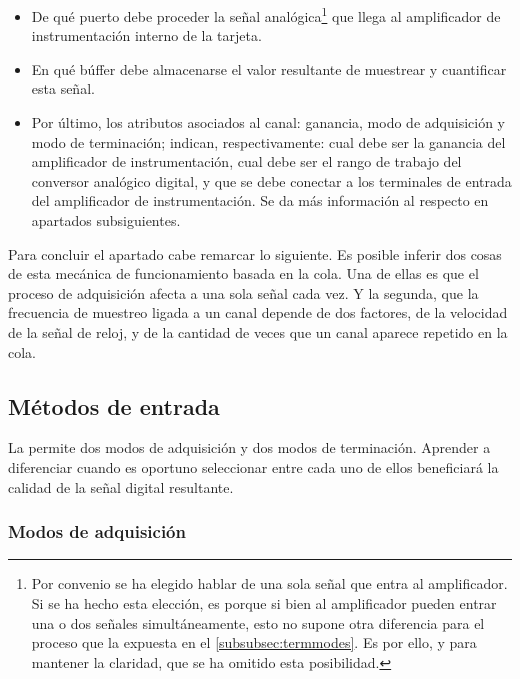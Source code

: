 \begin{itemize}
	\item De qué puerto debe proceder la señal analógica\footnote{Por
		convenio se ha elegido hablar de una sola señal que entra
		al amplificador. Si se ha hecho esta elección, es porque si
		bien al amplificador pueden entrar una o dos señales
		simultáneamente, esto no supone otra diferencia para el
		proceso que la expuesta en el \vref{subsubsec:termmodes}.
		Es por ello, y para mantener la claridad, que se ha omitido
		esta posibilidad.} que llega al amplificador de
		instrumentación interno de la tarjeta.
	\item En qué búffer debe almacenarse el valor resultante de
		muestrear y cuantificar esta señal.
	\item Por último, los atributos asociados al canal: ganancia, modo
		de adquisición y modo de terminación; indican,
		respectivamente: cual debe ser la ganancia del amplificador
		de instrumentación, cual debe ser el rango de trabajo del
		conversor analógico digital, y que se debe conectar a los
		terminales de entrada del amplificador de instrumentación.
		Se da más información al respecto en apartados
		subsiguientes.%
\end{itemize}

Para concluir el apartado cabe remarcar lo siguiente. Es posible inferir
dos cosas de esta mecánica de funcionamiento basada en la cola. Una de
ellas es que el proceso de adquisición afecta a una sola señal cada vez. Y
la segunda, que la frecuencia de muestreo ligada a un canal depende de dos
factores, de la velocidad de la señal de reloj, y de la cantidad de veces
que un canal aparece repetido en la cola.


\subsection{Métodos de entrada}

La \kpci{} permite dos modos de adquisición y dos modos de terminación.
Aprender a diferenciar cuando es oportuno seleccionar entre cada uno de
ellos beneficiará la calidad de la señal digital resultante.


\subsubsection{Modos de adquisición}

